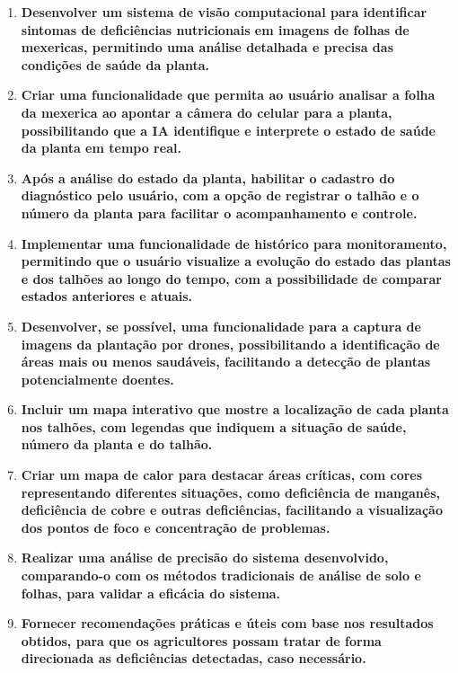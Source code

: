 \begin{enumerate} 
\item \textbf{Desenvolver um sistema de visão computacional para identificar sintomas de deficiências nutricionais em imagens de folhas de mexericas, permitindo uma análise detalhada e precisa das condições de saúde da planta.}
\item \textbf{Criar uma funcionalidade que permita ao usuário analisar a folha da mexerica ao apontar a câmera do celular para a planta, possibilitando que a IA identifique e interprete o estado de saúde da planta em tempo real.}
\item \textbf{Após a análise do estado da planta, habilitar o cadastro do diagnóstico pelo usuário, com a opção de registrar o talhão e o número da planta para facilitar o acompanhamento e controle.} 
\item \textbf{Implementar uma funcionalidade de histórico para monitoramento, permitindo que o usuário visualize a evolução do estado das plantas e dos talhões ao longo do tempo, com a possibilidade de comparar estados anteriores e atuais.}
\item \textbf{Desenvolver, se possível, uma funcionalidade para a captura de imagens da plantação por drones, possibilitando a identificação de áreas mais ou menos saudáveis, facilitando a detecção de plantas potencialmente doentes.}
\item \textbf{Incluir um mapa interativo que mostre a localização de cada planta nos talhões, com legendas que indiquem a situação de saúde, número da planta e do talhão.}
\item \textbf{Criar um mapa de calor para destacar áreas críticas, com cores representando diferentes situações, como deficiência de manganês, deficiência de cobre e outras deficiências, facilitando a visualização dos pontos de foco e concentração de problemas.}
\item \textbf{Realizar uma análise de precisão do sistema desenvolvido, comparando-o com os métodos tradicionais de análise de solo e folhas, para validar a eficácia do sistema.} 
\item \textbf{Fornecer recomendações práticas e úteis com base nos resultados obtidos, para que os agricultores possam tratar de forma direcionada as deficiências detectadas, caso necessário.} \end{enumerate}